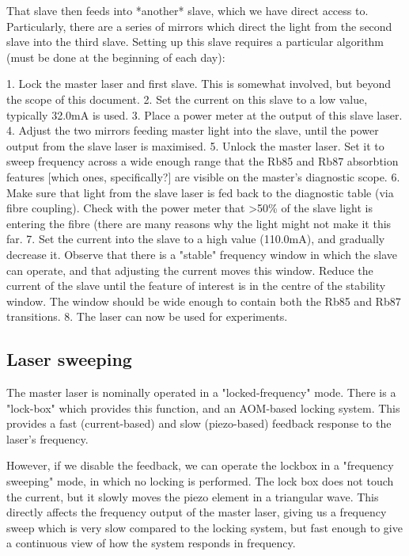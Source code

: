 That slave then feeds into *another* slave, which we have direct access to.  Particularly, there are a series of mirrors which direct the light from the second slave into the third slave.  Setting up this slave requires a particular algorithm (must be done at the beginning of each day):

 1. Lock the master laser and first slave.  This is somewhat involved, but beyond the scope of this document.
 2. Set the current on this slave to a low value, typically 32.0mA is used.
 3. Place a power meter at the output of this slave laser.
 4. Adjust the two mirrors feeding master light into the slave, until the power output from the slave laser is maximised.
 5. Unlock the master laser.  Set it to sweep frequency across a wide enough range that the Rb85 and Rb87 absorbtion features [which ones, specifically?] are visible on the master's diagnostic scope.
 6. Make sure that light from the slave laser is fed back to the diagnostic table (via fibre coupling).  Check with the power meter that >50\% of the slave light is entering the fibre (there are many reasons why the light might not make it this far.
 7. Set the current into the slave to a high value (110.0mA), and gradually decrease it.  Observe that there is a "stable" frequency window in which the slave can operate, and that adjusting the current moves this window.  Reduce the current of the slave until the feature of interest is in the centre of the stability window.  The window should be wide enough to contain both the Rb85 and Rb87 transitions.
 8. The laser can now be used for experiments.

\subsection{Laser sweeping}

The master laser is nominally operated in a "locked-frequency" mode.  There is a "lock-box" which provides this function, and an AOM-based locking system.  This provides a fast (current-based) and slow (piezo-based) feedback response to the laser's frequency.

However, if we disable the feedback, we can operate the lockbox in a "frequency sweeping" mode, in which no locking is performed.  The lock box does not touch the current, but it slowly moves the piezo element in a triangular wave.  This directly affects the frequency output of the master laser, giving us a frequency sweep which is very slow compared to the locking system, but fast enough to give a continuous view of how the system responds in frequency.

